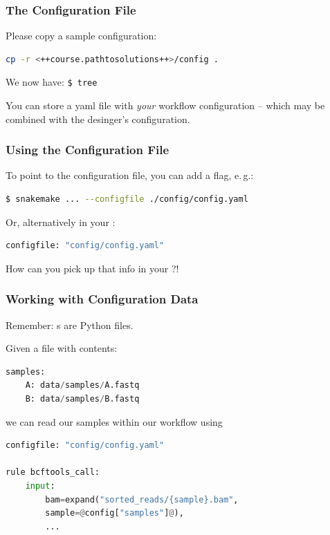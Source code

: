 \begin{frame}[fragile]
  \frametitle{The Configuration File}
  Please copy a sample configuration:
  \begin{lstlisting}[language=Bash, style=Shell]
cp -r <++course.pathtosolutions++>/config .
  \end{lstlisting}
  We now have:\newline
            {\tiny \DTsetlength{0.2em}{1em}{0.2em}{0.4pt}{.6pt}
\texttt{\$ tree}
}
 \pause
 \begin{docs}
 	You can store a yaml file with \emph{your} workflow configuration -- which may be combined with the desinger's configuration.
 \end{docs}
\end{frame}

\begin{frame}[fragile]
  \frametitle{Using the Configuration File}
  To point to the configuration file, you can add a flag, e.\,g.:
  \begin{lstlisting}[language=Bash, style=Shell]
$ snakemake ... --configfile ./config/config.yaml  
  \end{lstlisting}
  Or, alternatively in your :
  \begin{lstlisting}[language=Python,style=Python]
configfile: "config/config.yaml"
  \end{lstlisting}  
  \begin{question}
  	How can you pick up that info in your ?!
  \end{question}
\end{frame} 

\begin{frame}[fragile]
  \frametitle{Working with Configuration Data}
  \begin{hint}
  	Remember: s are Python files.
  \end{hint}
  \pause
  Given a file  with contents:
  \begin{lstlisting}[language=Python,style=Python]
samples:
    A: data/samples/A.fastq
    B: data/samples/B.fastq
  \end{lstlisting}
  we can read our samples within our workflow using
  \begin{lstlisting}[language=Python,style=Python]
configfile: "config/config.yaml"

rule bcftools_call:
    input:
        bam=expand("sorted_reads/{sample}.bam", 
        sample=@config["samples"]@),
        ...
  \end{lstlisting}
\end{frame}

